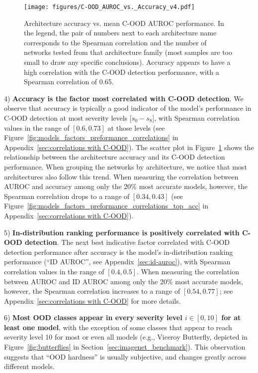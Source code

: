 \documentclass[table]{article} \usepackage{PRIMEarxiv}
\begin{document}
\begin{figure}[h]
    \centering
\texttt{[image: figures/C-OOD\_AUROC\_vs.\_Accuracy\_v4.pdf]}
    \caption{Architecture accuracy vs. mean C-OOD AUROC performance. 
    In the legend, the pair of numbers next to each architecture name corresponds to the Spearman correlation 
    and the number of networks tested from that architecture family (most samples are too small to draw any specific conclusions). 
    Accuracy appears to have a high correlation with the C-OOD detection performance, with a Spearman correlation of 0.65.
    }
    \label{fig:corr_Acc vs C-OOD AUROC}
\end{figure}
4) \textbf{Accuracy is the factor most correlated with C-OOD detection}.
We observe that accuracy is typically a good indicator of the model's performance in C-OOD detection at most severity levels [$s_0-s_8$], with Spearman correlation values in the range of $[0.6, 0.73]$ at those levels (see Figure~\ref{fig:models_factors_preformance_correlations} in Appendix~\ref{sec:correlations with C-OOD}).
The scatter plot in Figure~\ref{fig:corr_Acc vs C-OOD AUROC} shows the relationship between
the architecture accuracy and its C-OOD detection performance.
When grouping the networks by architecture, we notice that most architectures also follow this trend.
When measuring the correlation between AUROC and accuracy among only the 20\% most accurate models, however, the Spearman correlation drops to a range of $[0.34, 0.43]$ (see Figure~\ref{fig:models_factors_preformance_correlations_top_acc} in Appendix~\ref{sec:correlations with C-OOD}).

5) \textbf{In-distribution ranking performance is positively correlated with C-OOD detection}.
The next best indicative factor correlated with C-OOD detection performance after accuracy is the model's in-distribution ranking performance (``ID AUROC'', see Appendix~\ref{sec:id-auroc}), with Spearman correlation values in the range of $[0.4, 0.5]$. When measuring the correlation between AUROC and ID AUROC among only the 20\% most accurate models, however, the Spearman correlation increases to a range of $[0.54, 0.77]$;
see Appendix~\ref{sec:correlations with C-OOD} for more details.

6) \textbf{Most OOD classes appear in every severity level $i \in [0,10]$ for at least one model}, with the exception of some classes that appear to reach severity level 10 for most or even all models (e.g., Viceroy Butterfly, depicted in Figure~\ref{fig:butterflies} in Section~\ref{sec:imagenet_benchmark}).
This observation suggests that ``OOD hardness'' is usually subjective, and changes greatly across different models.
\end{document}
